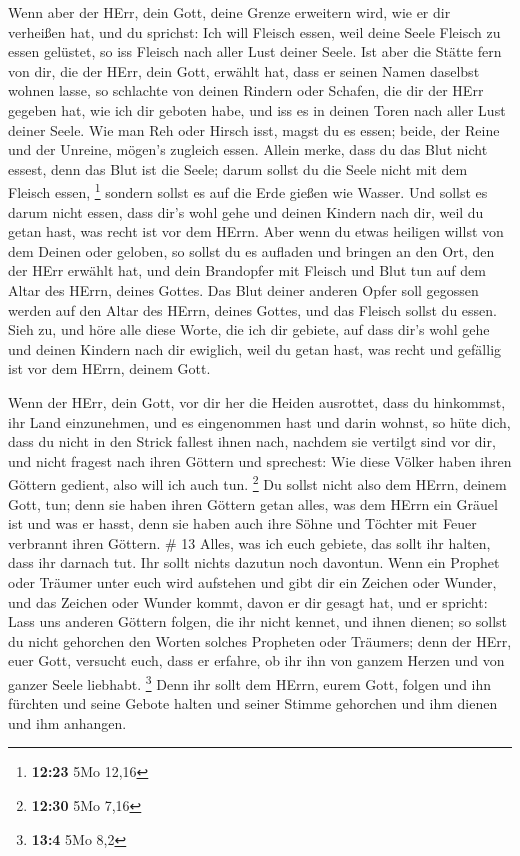  Wenn aber der HErr, dein Gott, deine Grenze erweitern
wird, wie er dir verheißen hat, und du sprichst: Ich will Fleisch essen,
weil deine Seele Fleisch zu essen gelüstet, so iss Fleisch nach aller
Lust deiner Seele.  Ist aber die Stätte fern von dir, die
der HErr, dein Gott, erwählt hat, dass er seinen Namen daselbst wohnen
lasse, so schlachte von deinen Rindern oder Schafen, die dir der HErr
gegeben hat, wie ich dir geboten habe, und iss es in deinen Toren nach
aller Lust deiner Seele.  Wie man Reh oder Hirsch isst,
magst du es essen; beide, der Reine und der Unreine, mögen's zugleich
essen.  Allein merke, dass du das Blut nicht essest, denn
das Blut ist die Seele; darum sollst du die Seele nicht mit dem Fleisch
essen, \footnote{\textbf{12:23} 5Mo 12,16}  sondern sollst
es auf die Erde gießen wie Wasser.  Und sollst es darum
nicht essen, dass dir's wohl gehe und deinen Kindern nach dir, weil du
getan hast, was recht ist vor dem HErrn.  Aber wenn du
etwas heiligen willst von dem Deinen oder geloben, so sollst du es
aufladen und bringen an den Ort, den der HErr erwählt hat, 
und dein Brandopfer mit Fleisch und Blut tun auf dem Altar des HErrn,
deines Gottes. Das Blut deiner anderen Opfer soll gegossen werden auf
den Altar des HErrn, deines Gottes, und das Fleisch sollst du essen.
 Sieh zu, und höre alle diese Worte, die ich dir gebiete,
auf dass dir's wohl gehe und deinen Kindern nach dir ewiglich, weil du
getan hast, was recht und gefällig ist vor dem HErrn, deinem Gott.

 Wenn der HErr, dein Gott, vor dir her die Heiden
ausrottet, dass du hinkommst, ihr Land einzunehmen, und es eingenommen
hast und darin wohnst,  so hüte dich, dass du nicht in den
Strick fallest ihnen nach, nachdem sie vertilgt sind vor dir, und nicht
fragest nach ihren Göttern und sprechest: Wie diese Völker haben ihren
Göttern gedient, also will ich auch tun. \footnote{\textbf{12:30} 5Mo
  7,16}  Du sollst nicht also dem HErrn, deinem Gott, tun;
denn sie haben ihren Göttern getan alles, was dem HErrn ein Gräuel ist
und was er hasst, denn sie haben auch ihre Söhne und Töchter mit Feuer
verbrannt ihren Göttern. \# 13  Alles, was ich euch gebiete,
das sollt ihr halten, dass ihr darnach tut. Ihr sollt nichts dazutun
noch davontun.  Wenn ein Prophet oder Träumer unter euch
wird aufstehen und gibt dir ein Zeichen oder Wunder,  und
das Zeichen oder Wunder kommt, davon er dir gesagt hat, und er spricht:
Lass uns anderen Göttern folgen, die ihr nicht kennet, und ihnen dienen;
 so sollst du nicht gehorchen den Worten solches Propheten
oder Träumers; denn der HErr, euer Gott, versucht euch, dass er erfahre,
ob ihr ihn von ganzem Herzen und von ganzer Seele liebhabt. \footnote{\textbf{13:4}
  5Mo 8,2}  Denn ihr sollt dem HErrn, eurem Gott, folgen und
ihn fürchten und seine Gebote halten und seiner Stimme gehorchen und ihm
dienen und ihm anhangen.

